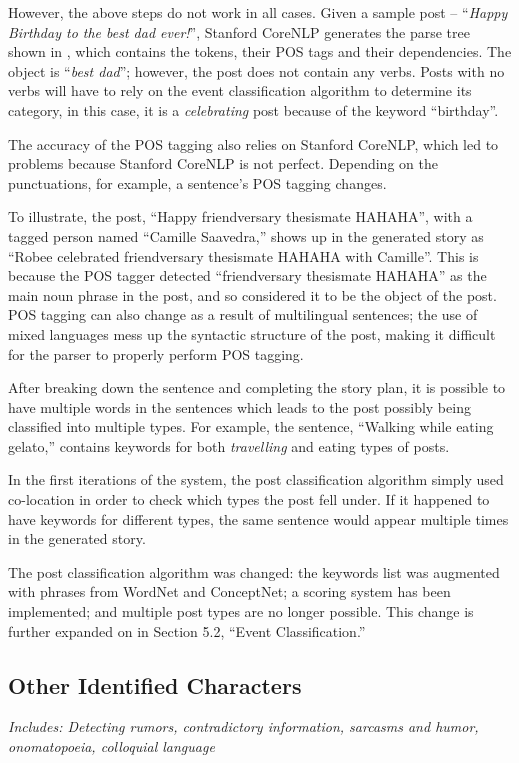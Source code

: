 However, the above steps do not work in all cases. Given a sample post -- ``\textit{Happy Birthday to the best dad ever!}”, Stanford CoreNLP generates the parse tree shown in , which contains the tokens, their POS tags and their dependencies. The object is ``\textit{best dad}”; however, the post does not contain any verbs. Posts with no verbs will have to rely on the event classification algorithm to determine its category, in this case, it is a \textit{celebrating} post because of the keyword ``birthday”.

The accuracy of the POS tagging also relies on Stanford CoreNLP, which led to problems because Stanford CoreNLP is not perfect. Depending on the punctuations, for example, a sentence's POS tagging changes. 

To illustrate, the post, ``Happy friendversary thesismate HAHAHA”, with a tagged person named ``Camille Saavedra,” shows up in the generated story as ``Robee celebrated friendversary thesismate HAHAHA with Camille”. This is because the POS tagger detected ``friendversary thesismate HAHAHA” as the main noun phrase in the post, and so considered it to be the object of the post. POS tagging can also change as a result of multilingual sentences; the use of mixed languages mess up the syntactic structure of the post, making it difficult for the parser to properly perform POS tagging.

After breaking down the sentence and completing the story plan, it is possible to have multiple words in the sentences which leads to the post possibly being classified into multiple types. For example, the sentence, ``Walking while eating gelato,” contains keywords for both \textit{travelling} and eating types of posts.

In the first iterations of the system, the post classification algorithm simply used co-location in order to check which types the post fell under. If it happened to have keywords for different types, the same sentence would appear multiple times in the generated story.

The post classification algorithm was changed: the keywords list was augmented with phrases from WordNet and ConceptNet; a scoring system has been implemented; and multiple post types are no longer possible. This change is further expanded on in Section 5.2, ``Event Classification.”

\subsection{Other Identified Characters}
\textit{Includes: Detecting rumors, contradictory information, sarcasms and humor, onomatopoeia, colloquial language}

